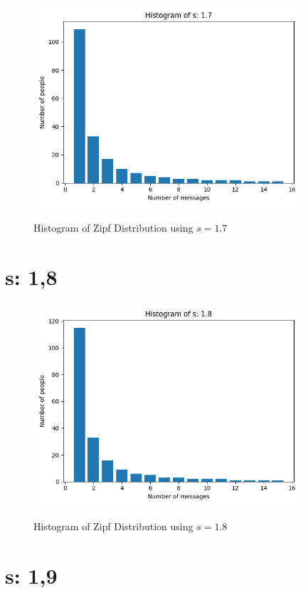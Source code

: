 \documentclass{article}
\begin{document}
\begin{figure}[H] \centering
 \includegraphics[width=10cm]{imgs/histogram-17.png}
 \label{fig:hist-17}
 \caption{Histogram of Zipf Distribution using $s=1.7$} \end{figure}




\section{s: 1,8}

\begin{figure}[H] \centering
 \includegraphics[width=10cm]{imgs/histogram-18.png}
 \label{fig:hist-18}
 \caption{Histogram of Zipf Distribution using $s=1.8$} \end{figure}




\section{s: 1,9}
\end{document}
